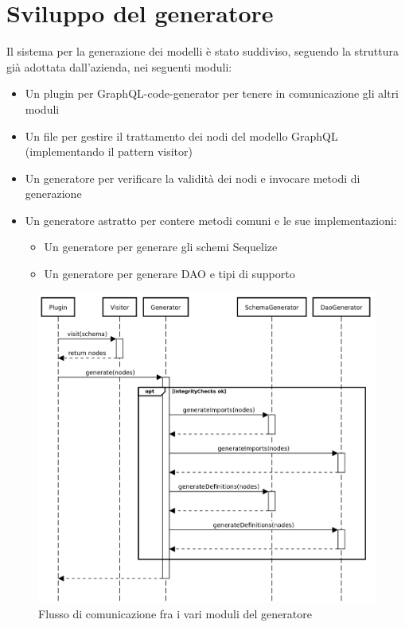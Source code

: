 \documentclass[a4paper, 12pt]{report}
\begin{document}
    \chapter{Sviluppo del generatore}
      Il sistema per la generazione dei modelli è stato suddiviso, seguendo la struttura già adottata dall'azienda, nei seguenti moduli:
      \begin{itemize}
        \item Un plugin per GraphQL-code-generator per tenere in comunicazione gli altri moduli
        \item Un file per gestire il trattamento dei nodi del modello GraphQL (implementando il pattern visitor)
        \item Un generatore per verificare la validità dei nodi e invocare metodi di generazione
        \item Un generatore astratto per contere metodi comuni e le sue implementazioni:
        \begin{itemize}
          \item Un generatore per generare gli schemi Sequelize
          \item Un generatore per generare DAO e tipi di supporto
        \end{itemize}
      \end{itemize}
      \begin{figure}[H]
        \includegraphics[width=\textwidth]{generator_workflow.png}
        \caption{Flusso di comunicazione fra i vari moduli del generatore}
      \end{figure}
\end{document}
